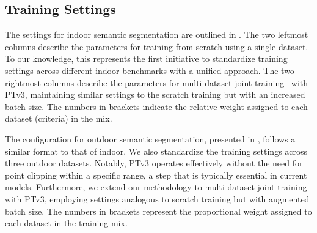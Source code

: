 \subsection{Training Settings}
\begin{table}[!t]
    \begin{minipage}{0.48\textwidth}
    \centering
        
        \vspace{-3mm}
        \caption{\textbf{Model settings.} }\label{tab:appendix_model_settings}
        \vspace{2mm}
    \end{minipage}
    \begin{minipage}{0.48\textwidth}
    \centering
        
        \vspace{-3mm}
        \caption{\textbf{Data augmentations.} }\label{tab:appendix_data_augmentations}
        \vspace{-6mm}
    \end{minipage}
\end{table}
The settings for indoor semantic segmentation are outlined in . The two leftmost columns describe the parameters for training from scratch using a single dataset. To our knowledge, this represents the first initiative to standardize training settings across different indoor benchmarks with a unified approach. The two rightmost columns describe the parameters for multi-dataset joint training~\cite{wu2023ppt} with PTv3, maintaining similar settings to the scratch training but with an increased batch size. The numbers in brackets indicate the relative weight assigned to each dataset (criteria) in the mix.

The configuration for outdoor semantic segmentation, presented in , follows a similar format to that of indoor. We also standardize the training settings across three outdoor datasets. Notably, PTv3 operates effectively without the need for point clipping within a specific range, a step that is typically essential in current models. Furthermore, we extend our methodology to multi-dataset joint training with PTv3, employing settings analogous to scratch training but with augmented batch size. The numbers in brackets represent the proportional weight assigned to each dataset in the training mix.

